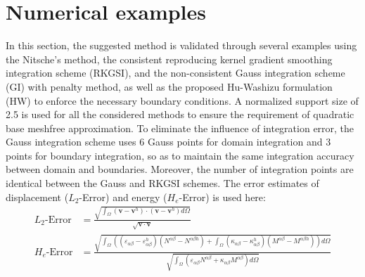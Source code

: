 
\section{Numerical examples}\label{examples}
In this section, the suggested method is validated through several examples using the Nitsche's method, the consistent reproducing kernel gradient smoothing integration scheme (RKGSI), and the non-consistent Gauss integration scheme (GI) with penalty method, as well as the proposed Hu-Washizu formulation (HW) to enforce the necessary boundary conditions. A normalized support size of 2.5 is used for all the considered methods to ensure the requirement of quadratic base meshfree approximation. To eliminate the influence of integration error, the Gauss integration scheme uses 6 Gauss points for domain integration and 3 points for boundary integration, so as to maintain the same integration accuracy between domain and boundaries. Moreover, the number of integration points are identical between the Gauss and RKGSI schemes. The error estimates of displacement ($L_2$-Error) and energy ($H_e$-Error) is used here:
\begin{equation}
\begin{split}
L_2\text{-Error} &= \frac{\sqrt{\int_\Omega(\boldsymbol v - \boldsymbol v^h) \cdot (\boldsymbol v - \boldsymbol v^h)d\Omega}}{\sqrt{\boldsymbol v \cdot \boldsymbol v}} \\
H_e\text{-Error} &= \frac{\sqrt{\int_\Omega \left ((\varepsilon_{\alpha\beta} - \varepsilon_{\alpha\beta}^h)(N^{\alpha\beta} - N^{\alpha\beta h}) + \int_\Omega(\kappa_{\alpha\beta}-\kappa_{\alpha\beta}^h)(M^{\alpha\beta}-M^{\alpha\beta h}) \right )d\Omega}}{\sqrt{\int_\Omega(\varepsilon_{\alpha\beta}N^{\alpha\beta} + \kappa_{\alpha\beta}M^{\alpha\beta})d\Omega}}
\end{split}
\end{equation}

